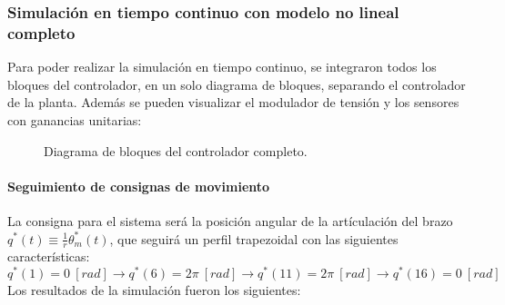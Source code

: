 \documentclass[a4paper, 10pt, onecolumn,journal]{ieeeconf}
\begin{document}
\subsubsection{\textbf{Simulación en tiempo continuo con modelo no lineal completo}}
Para poder realizar la simulación en tiempo continuo, se integraron todos los bloques del controlador, en un solo diagrama de bloques, separando el controlador de la planta. Además se pueden visualizar el modulador de tensión y los sensores con ganancias unitarias:
\begin{figure}[H]
	\centering
	\begin{adjustbox}{max width=\columnwidth}
	\end{adjustbox}
	\caption{Diagrama de bloques del controlador completo.}
	\label{Diagrama de bloques del controlador completo}
\end{figure}


\paragraph{\textbf{Seguimiento de consignas de movimiento}}
La consigna para el sistema será la posición angular de la artículación del brazo \ensuremath{{q^*}(t) \equiv \frac{1}{r} {\theta^*_m}(t)}, que seguirá un perfil trapezoidal con las siguientes características:
\begin{equation}
	{q^*}(1)=0 \: [rad] \longrightarrow {q^*}(6)=2 \pi \: [rad] \longrightarrow {q^*}(11)=2 \pi \: [rad]\longrightarrow {q^*}(16)=0 \: [rad]
\end{equation}
Los resultados de la simulación fueron los siguientes:
\end{document}

